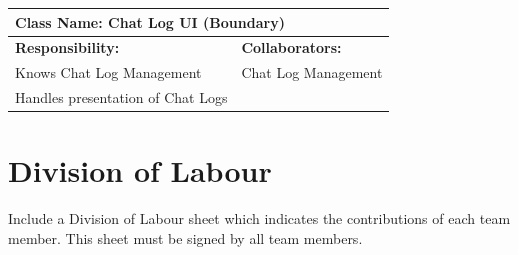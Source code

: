 \documentclass[]{article}
\begin{document}
	\begin{table}[ht]
		\centering
		\begin{tabular}{|p{7cm}|p{7cm}|}
		\hline 
			\multicolumn{2}{|l|}{\textbf{Class Name:} Chat Log UI (Boundary)} \\
		\hline
		\textbf{Responsibility:} & \textbf{Collaborators:} \\
		\hline
		Knows Chat Log Management & Chat Log Management\\
		Handles presentation of Chat Logs & \\
		\hline
		\end{tabular}
	\end{table}



\appendix
\section{Division of Labour}
\label{sec:division_of_labour}
Include a Division of Labour sheet which indicates the contributions of each team member. This sheet must be signed by all team members.
\end{document}
